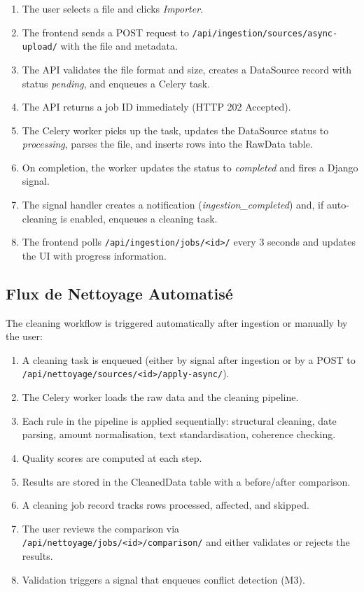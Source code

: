 \begin{enumerate}
  \item The user selects a file and clicks \textit{Importer}.
  \item The frontend sends a POST request to
        \texttt{/api/ingestion/sources/async-upload/}
        with the file and metadata.
  \item The API validates the file format and size,
        creates a DataSource record with status
        \textit{pending}, and enqueues a Celery task.
  \item The API returns a job ID immediately
        (HTTP 202 Accepted).
  \item The Celery worker picks up the task,
        updates the DataSource status to
        \textit{processing}, parses the file,
        and inserts rows into the RawData table.
  \item On completion, the worker updates the status
        to \textit{completed} and fires a Django signal.
  \item The signal handler creates a notification
        (\textit{ingestion\_completed}) and,
        if auto-cleaning is enabled, enqueues
        a cleaning task.
  \item The frontend polls \texttt{/api/ingestion/jobs/<id>/}
        every 3 seconds and updates the UI
        with progress information.
\end{enumerate}

\subsection{Flux de Nettoyage Automatisé}

\noindent
The cleaning workflow is triggered automatically
after ingestion or manually by the user:

\begin{enumerate}
  \item A cleaning task is enqueued
        (either by signal after ingestion or by
        a POST to \texttt{/api/nettoyage/sources/<id>/apply-async/}).
  \item The Celery worker loads the raw data
        and the cleaning pipeline.
  \item Each rule in the pipeline is applied sequentially:
        structural cleaning, date parsing,
        amount normalisation, text standardisation,
        coherence checking.
  \item Quality scores are computed at each step.
  \item Results are stored in the CleanedData table
        with a before/after comparison.
  \item A cleaning job record tracks rows processed,
        affected, and skipped.
  \item The user reviews the comparison
        via \texttt{/api/nettoyage/jobs/<id>/comparison/}
        and either validates or rejects the results.
  \item Validation triggers a signal that enqueues
        conflict detection (M3).
\end{enumerate}


